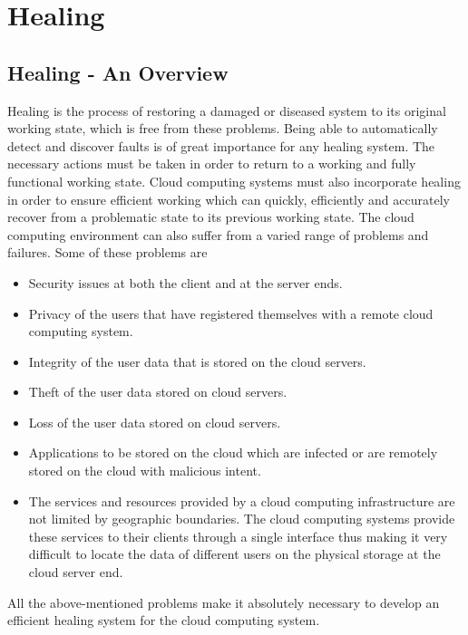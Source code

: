
\chapter{Healing}
\section{Healing - An Overview}
Healing is the process of restoring a damaged or diseased system to its original working state, which is free from these problems. Being able to automatically detect and discover faults is of great importance for any healing system. The necessary actions must be taken in order to return to a working and fully functional working state. Cloud computing systems must also incorporate healing in order to ensure efficient working which can quickly, efficiently and accurately recover from a problematic state to its previous working state.  
The cloud computing environment can also suffer from a varied range of problems and failures. Some of these problems are 
	\begin{itemize}
		\item Security issues at both the client and at the server ends.
		\item Privacy of the users that have registered themselves with a remote cloud computing system.
		\item Integrity of the user data that is stored on the cloud servers.
		\item Theft of the user data stored on cloud servers.
		\item Loss of the user data stored on cloud servers.
		\item Applications to be stored on the cloud which are infected or are remotely stored on the cloud with malicious intent.
		\item The services and resources provided by a cloud computing infrastructure are not limited by geographic boundaries. The cloud computing systems provide these services to their clients through a single interface thus making it very difficult to locate the data of different users on the physical storage at the cloud server end.
	\end{itemize}
All the above-mentioned problems make it absolutely necessary to develop an efficient healing system for the cloud computing system.
